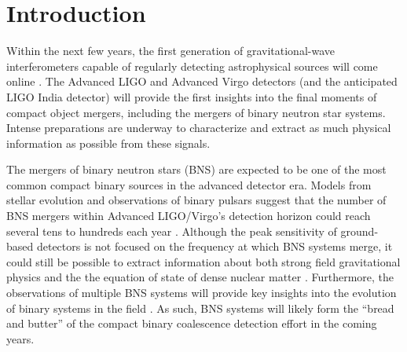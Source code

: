 \documentclass[11pt,a4paper]{emulateapj} 
\newcommand{\will}[1]{{\color{cyan} #1}}
\begin{document}
\maketitle
\section{Introduction}

Within the next few years, the first generation of gravitational-wave
interferometers capable of regularly detecting astrophysical sources will
come online \citep{AdvLIGO,AdvVirgo}.  The Advanced LIGO and Advanced Virgo
detectors (and the anticipated LIGO India detector)
 will provide the first insights into the final moments of
 compact object mergers, including the mergers of binary neutron
star systems.  Intense preparations are underway to characterize and
extract as much physical information as possible from these signals.
 
The mergers of binary neutron stars (BNS) are expected to be one of the most
common compact binary sources in the advanced detector era.  %
  Models from stellar
evolution and observations of binary pulsars suggest that the number
of BNS mergers within Advanced LIGO/Virgo's detection
horizon could reach several tens to hundreds each year
\citep{RatesPaper}.  Although the peak sensitivity of ground-based
detectors is not focused on the frequency at which BNS systems merge,
it could still be possible to extract information about both strong
field gravitational physics \citep{Li2012} and the the equation of state of
dense nuclear matter
\citep{HindererBNS2010}.  Furthermore, the observations of multiple BNS systems
will provide key insights into the evolution of binary systems in the
field \citep{VickyRates,KimRates,OsowskiRates2011,RichardRates2010} . As such, BNS systems will likely
form the ``bread and butter'' of the compact binary coalescence
detection effort in the coming years.
\end{document}
